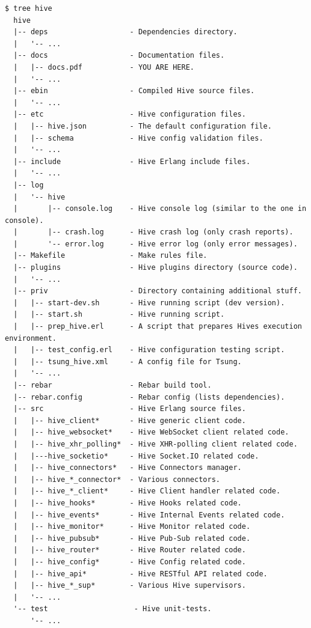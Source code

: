\documentclass[a4paper]{article}
\begin{document}
\begin{verbatim}
$ tree hive
  hive
  |-- deps                   - Dependencies directory.
  |   '-- ...
  |-- docs                   - Documentation files.
  |   |-- docs.pdf           - YOU ARE HERE.
  |   '-- ...
  |-- ebin                   - Compiled Hive source files.
  |   '-- ...
  |-- etc                    - Hive configuration files.
  |   |-- hive.json          - The default configuration file.
  |   |-- schema             - Hive config validation files.
  |   '-- ...
  |-- include                - Hive Erlang include files.
  |   '-- ...
  |-- log
  |   '-- hive
  |       |-- console.log    - Hive console log (similar to the one in console).
  |       |-- crash.log      - Hive crash log (only crash reports).
  |       '-- error.log      - Hive error log (only error messages).
  |-- Makefile               - Make rules file.
  |-- plugins                - Hive plugins directory (source code).
  |   '-- ...
  |-- priv                   - Directory containing additional stuff.
  |   |-- start-dev.sh       - Hive running script (dev version).
  |   |-- start.sh           - Hive running script.
  |   |-- prep_hive.erl      - A script that prepares Hives execution environment.
  |   |-- test_config.erl    - Hive configuration testing script.
  |   |-- tsung_hive.xml     - A config file for Tsung.
  |   '-- ...
  |-- rebar                  - Rebar build tool.
  |-- rebar.config           - Rebar config (lists dependencies).
  |-- src                    - Hive Erlang source files.
  |   |-- hive_client*       - Hive generic client code.
  |   |-- hive_websocket*    - Hive WebSocket client related code.
  |   |-- hive_xhr_polling*  - Hive XHR-polling client related code.
  |   |---hive_socketio*     - Hive Socket.IO related code.
  |   |-- hive_connectors*   - Hive Connectors manager.
  |   |-- hive_*_connector*  - Various connectors.
  |   |-- hive_*_client*     - Hive Client handler related code.
  |   |-- hive_hooks*        - Hive Hooks related code.
  |   |-- hive_events*       - Hive Internal Events related code.
  |   |-- hive_monitor*      - Hive Monitor related code.
  |   |-- hive_pubsub*       - Hive Pub-Sub related code.
  |   |-- hive_router*       - Hive Router related code.
  |   |-- hive_config*       - Hive Config related code.
  |   |-- hive_api*          - Hive RESTful API related code.
  |   |-- hive_*_sup*        - Various Hive supervisors.
  |   '-- ...
  '-- test                    - Hive unit-tests.
      '-- ...
\end{verbatim}
\end{document}
